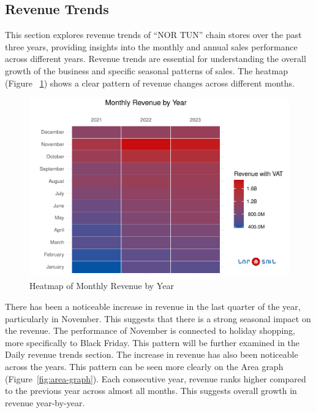 \documentclass[conference]{IEEEtran}
\begin{document}
\subsection{Revenue Trends}
This section explores revenue trends of ``NOR TUN'' chain stores over the past three years, providing insights into the monthly and annual sales performance across different years. Revenue trends are essential for understanding the overall growth of the business and specific seasonal patterns of sales. The heatmap (Figure ~\ref{fig:heatmap}) shows a clear pattern of revenue changes across different months.
\begin{figure}[htbp]
\centering
\includegraphics[width=\columnwidth,keepaspectratio]{./figures/heatmap_sales.pdf}
\caption{Heatmap of Monthly Revenue by Year\cite{heatmap}}
\label{fig:heatmap}
\end{figure}
There has been a noticeable increase in revenue in the last quarter of the year, particularly in November. This suggests that there is a strong seasonal impact on the revenue. The performance of November is connected to holiday shopping, more specifically to Black Friday. This pattern will be further examined in the Daily revenue trends section. The increase in revenue has also been noticeable across the years. This pattern can be seen more clearly on the Area graph (Figure~\ref{fig:area-graph}). Each consecutive year, revenue ranks higher compared to the previous year across almost all months. This suggests overall growth in revenue year-by-year.
\end{document}
